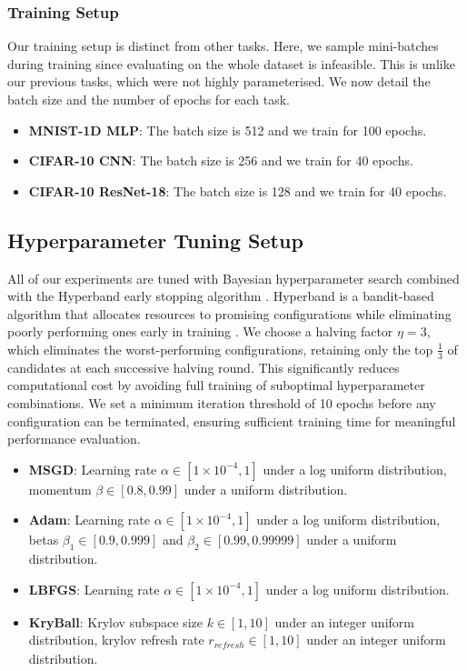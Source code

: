 \subsubsection{Training Setup}
\label{sssec:task_3_training_setup}

Our training setup is distinct from other tasks. Here, we sample mini-batches during training since evaluating on the whole dataset is infeasible. This is unlike our previous tasks, which were not highly parameterised. We now detail the batch size and the number of epochs for each task.
\begin{itemize}
    \item \textbf{MNIST-1D MLP}: The batch size is 512 and we train for 100 epochs.
    \item \textbf{CIFAR-10 CNN}: The batch size is 256 and we train for 40 epochs.
    \item \textbf{CIFAR-10 ResNet-18}: The batch size is 128 and we train for 40 epochs.
\end{itemize}

\subsection{Hyperparameter Tuning Setup}
\label{ssec:hyperparameter_tuning_setup}

All of our experiments are tuned with Bayesian hyperparameter search combined with the Hyperband early stopping algorithm \citep{li2018hyperband}. Hyperband is a bandit-based algorithm that allocates resources to promising configurations while eliminating poorly performing ones early in training \citep{li2018hyperband}. We choose a halving factor $\eta = 3$, which eliminates the worst-performing configurations, retaining only the top $\frac{1}{3}$ of candidates at each successive halving round. This significantly reduces computational cost by avoiding full training of suboptimal hyperparameter combinations. We set a minimum iteration threshold of 10 epochs before any configuration can be terminated, ensuring sufficient training time for meaningful performance evaluation.

\begin{itemize}
    \item \textbf{MSGD}: Learning rate $\alpha \in [1 \times 10^{-4}, 1]$ under a log uniform distribution, momentum $\beta \in [0.8, 0.99]$ under a uniform distribution.
    \item \textbf{Adam}: Learning rate $\alpha \in [1 \times 10^{-4}, 1]$ under a log uniform distribution, betas $\beta_1 \in [0.9, 0.999]$ and $\beta_2 \in [0.99, 0.99999]$ under a uniform distribution.
    \item \textbf{LBFGS}: Learning rate $\alpha \in [1 \times 10^{-4}, 1]$ under a log uniform distribution.
    \item \textbf{KryBall}: Krylov subspace size $k \in [1, 10]$ under an integer uniform distribution, krylov refresh rate $r_{\mathit{refresh}} \in [1, 10]$ under an integer uniform distribution.
\end{itemize}

